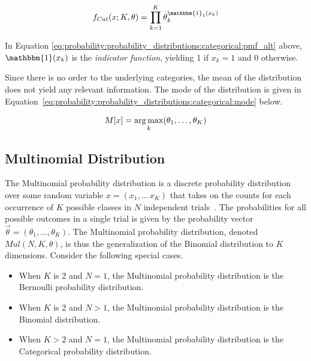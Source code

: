 \begin{equation}
      \label{eq:probability:probability_distributions:categorical:pmf_alt}
      f_{Cat}(x; K, \theta) = \prod_{k=1}^{K}\theta_{k}^{\mathbbm{1}_{1}(x_{k})}
\end{equation}

\noindent
In Equation \ref{eq:probability:probability_distributions:categorical:pmf_alt} above, $\mathbbm{1}(x_{k})$ is the \textit{indicator function}, yielding 1 if $x_{k} = 1$ and 0 otherwise.

Since there is no order to the underlying categories, the mean of the distribution does not yield any relevant information. The mode of the distribution is given in Equation~\eqref{eq:probability:probability_distributions:categorical:mode} below.

\begin{equation}
      \label{eq:probability:probability_distributions:categorical:mode}
      M[x] = \operatorname*{arg\,max}_{k}(\theta_{1}, \dots, \theta_{K})
\end{equation}


\subsection{Multinomial Distribution}
\label{sec:probability:probability_distributions:multinomial}

The Multinomial probability distribution is a discrete probability distribution over some random variable $x = (x_{1}, \dots\, x_{K})$ that takes on the counts for each occurrence of $K$ possible classes in $N$ independent trials~\cite{ref:wackerly:2014}. The probabilities for all possible outcomes in a single trial is given by the probability vector $\vec{\theta} = (\theta_{1}, \dots, \theta_{K})$. The Multinomial probability distribution, denoted $Mul(N, K, \theta)$, is thus the generalization of the Binomial distribution to $K$ dimensions. Consider the following special cases.

\begin{itemize}
      \item When $K$ is 2 and $N = 1$, the Multinomial probability distribution is the Bernoulli probability distribution.
      \item When $K$ is 2 and $N > 1$, the Multinomial probability distribution is the Binomial distribution.
      \item When $K > 2$ and $N = 1$, the Multinomial probability distribution is the Categorical probability distribution.
\end{itemize}

